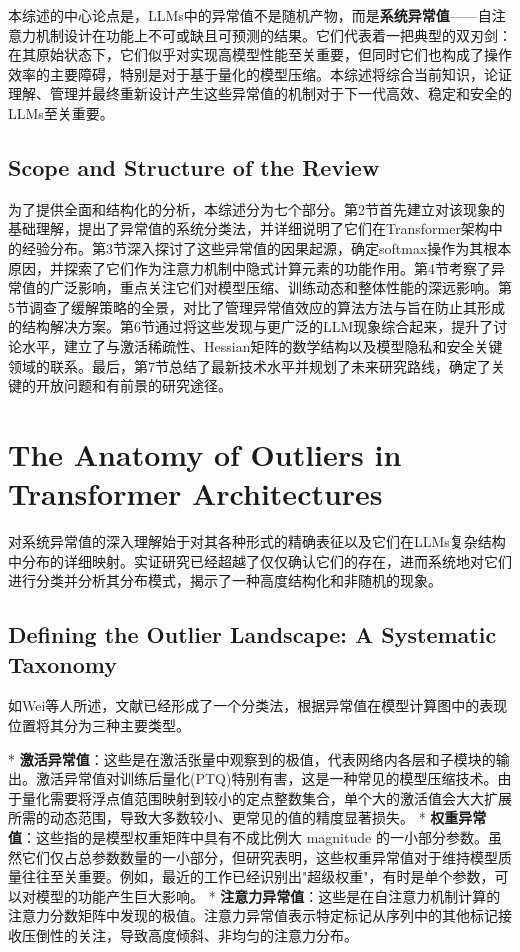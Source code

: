 \documentclass{article}
\begin{document}
本综述的中心论点是，LLMs中的异常值不是随机产物，而是\textbf{系统异常值}——自注意力机制设计在功能上不可或缺且可预测的结果。它们代表着一把典型的双刃剑：在其原始状态下，它们似乎对实现高模型性能至关重要，但同时它们也构成了操作效率的主要障碍，特别是对于基于量化的模型压缩。本综述将综合当前知识，论证理解、管理并最终重新设计产生这些异常值的机制对于下一代高效、稳定和安全的LLMs至关重要。

\subsection{Scope and Structure of the Review}

为了提供全面和结构化的分析，本综述分为七个部分。第2节首先建立对该现象的基础理解，提出了异常值的系统分类法，并详细说明了它们在Transformer架构中的经验分布。第3节深入探讨了这些异常值的因果起源，确定softmax操作为其根本原因，并探索了它们作为注意力机制中隐式计算元素的功能作用。第4节考察了异常值的广泛影响，重点关注它们对模型压缩、训练动态和整体性能的深远影响。第5节调查了缓解策略的全景，对比了管理异常值效应的算法方法与旨在防止其形成的结构解决方案。第6节通过将这些发现与更广泛的LLM现象综合起来，提升了讨论水平，建立了与激活稀疏性、Hessian矩阵的数学结构以及模型隐私和安全关键领域的联系。最后，第7节总结了最新技术水平并规划了未来研究路线，确定了关键的开放问题和有前景的研究途径。

\section{The Anatomy of Outliers in Transformer Architectures}

对系统异常值的深入理解始于对其各种形式的精确表征以及它们在LLMs复杂结构中分布的详细映射。实证研究已经超越了仅仅确认它们的存在，进而系统地对它们进行分类并分析其分布模式，揭示了一种高度结构化和非随机的现象。

\subsection{Defining the Outlier Landscape: A Systematic Taxonomy}

如Wei等人\cite{wei2023outlier}所述，文献已经形成了一个分类法，根据异常值在模型计算图中的表现位置将其分为三种主要类型。

* \textbf{激活异常值}：这些是在激活张量中观察到的极值，代表网络内各层和子模块的输出。激活异常值对训练后量化(PTQ)特别有害，这是一种常见的模型压缩技术。由于量化需要将浮点值范围映射到较小的定点整数集合，单个大的激活值会大大扩展所需的动态范围，导致大多数较小、更常见的值的精度显著损失。
* \textbf{权重异常值}：这些指的是模型权重矩阵中具有不成比例大 magnitude 的一小部分参数。虽然它们仅占总参数数量的一小部分，但研究表明，这些权重异常值对于维持模型质量往往至关重要。例如，最近的工作已经识别出"超级权重"，有时是单个参数，可以对模型的功能产生巨大影响。
* \textbf{注意力异常值}：这些是在自注意力机制计算的注意力分数矩阵中发现的极值。注意力异常值表示特定标记从序列中的其他标记接收压倒性的关注，导致高度倾斜、非均匀的注意力分布。
\end{document}
